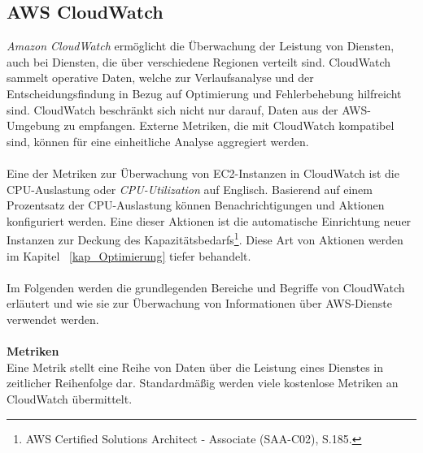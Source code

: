 \subsection{AWS CloudWatch}\label{ssec:CloudWatch}
\textit{Amazon CloudWatch} ermöglicht die Überwachung der Leistung von Diensten, auch bei Diensten, die über verschiedene Regionen verteilt sind. CloudWatch sammelt operative Daten, welche zur Verlaufsanalyse und der Entscheidungsfindung in Bezug auf Optimierung und Fehlerbehebung hilfreicht sind. CloudWatch beschränkt sich nicht nur darauf, Daten aus der AWS-Umgebung zu empfangen. Externe Metriken, die mit CloudWatch kompatibel sind, können für eine einheitliche Analyse aggregiert werden. 
\\\\
Eine der Metriken zur Überwachung von EC2-Instanzen in CloudWatch ist die CPU-Auslastung oder \textit{CPU-Utilization} auf Englisch. Basierend auf einem Prozentsatz der CPU-Auslastung können Benachrichtigungen und Aktionen konfiguriert werden. Eine dieser Aktionen ist die automatische Einrichtung neuer Instanzen zur Deckung des Kapazitätsbedarfs\footnote{AWS Certified Solutions Architect - Associate (SAA-C02), S.185.\cite{AWS1}}. Diese Art von Aktionen werden im Kapitel ~\ref{kap_Optimierung} tiefer behandelt.
\\\\
Im Folgenden werden die grundlegenden Bereiche und Begriffe von CloudWatch erläutert und wie sie zur Überwachung von Informationen über AWS-Dienste verwendet werden.
\\\\
\textbf{Metriken} \\
Eine Metrik stellt eine Reihe von Daten über die Leistung eines Dienstes in zeitlicher Reihenfolge dar. Standardmäßig werden viele kostenlose Metriken an CloudWatch übermittelt.

